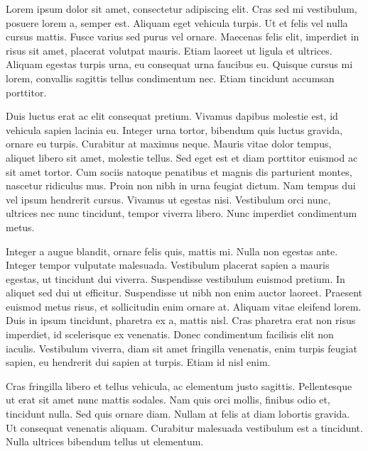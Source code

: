 \documentclass[11pt]{hmcpset}
\begin{document}
			
\begin{problem}
Lorem ipsum dolor sit amet, consectetur adipiscing elit. Cras sed mi vestibulum, posuere lorem a, semper est. Aliquam eget vehicula turpis. Ut et felis vel nulla cursus mattis. Fusce varius sed purus vel ornare. Maecenas felis elit, imperdiet in risus sit amet, placerat volutpat mauris. Etiam laoreet ut ligula et ultrices. Aliquam egestas turpis urna, eu consequat urna faucibus eu. Quisque cursus mi lorem, convallis sagittis tellus condimentum nec. Etiam tincidunt accumsan porttitor.
\end{problem}

\begin{solution}
Duis luctus erat ac elit consequat pretium. Vivamus dapibus molestie est, id vehicula sapien lacinia eu. Integer urna tortor, bibendum quis luctus gravida, ornare eu turpis. Curabitur at maximus neque. Mauris vitae dolor tempus, aliquet libero sit amet, molestie tellus. Sed eget est et diam porttitor euismod ac sit amet tortor. Cum sociis natoque penatibus et magnis dis parturient montes, nascetur ridiculus mus. Proin non nibh in urna feugiat dictum. Nam tempus dui vel ipsum hendrerit cursus. Vivamus ut egestas nisi. Vestibulum orci nunc, ultrices nec nunc tincidunt, tempor viverra libero. Nunc imperdiet condimentum metus.

Integer a augue blandit, ornare felis quis, mattis mi. Nulla non egestas ante. Integer tempor vulputate malesuada. Vestibulum placerat sapien a mauris egestas, ut tincidunt dui viverra. Suspendisse vestibulum euismod pretium. In aliquet sed dui ut efficitur. Suspendisse ut nibh non enim auctor laoreet. Praesent euismod metus risus, et sollicitudin enim ornare at. Aliquam vitae eleifend lorem. Duis in ipsum tincidunt, pharetra ex a, mattis nisl. Cras pharetra erat non risus imperdiet, id scelerisque ex venenatis. Donec condimentum facilisis elit non iaculis. Vestibulum viverra, diam sit amet fringilla venenatis, enim turpis feugiat sapien, eu hendrerit dui sapien at turpis. Etiam id nisl enim.

Cras fringilla libero et tellus vehicula, ac elementum justo sagittis. Pellentesque ut erat sit amet nunc mattis sodales. Nam quis orci mollis, finibus odio et, tincidunt nulla. Sed quis ornare diam. Nullam at felis at diam lobortis gravida. Ut consequat venenatis aliquam. Curabitur malesuada vestibulum est a tincidunt. Nulla ultrices bibendum tellus ut elementum.


\end{solution}
\end{document}
